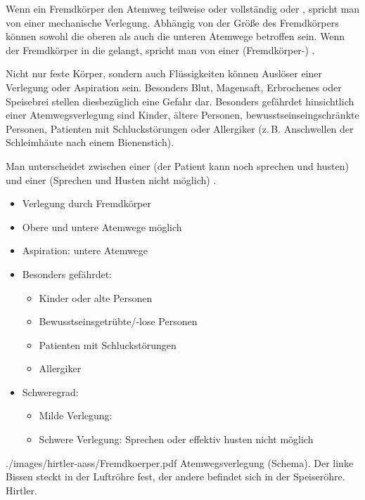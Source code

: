 {%
%
Wenn ein Fremdkörper den Atemweg teilweise oder vollständig 
 oder , spricht man von einer
mechanische Verlegung. Abhängig von der Größe des
Fremdkörpers können sowohl die oberen als auch die unteren
Atemwege betroffen sein. Wenn der Fremdkörper in die
 gelangt, spricht man von einer
(Fremdkörper-) .

Nicht nur feste Körper, sondern auch Flüssigkeiten können
Auslöser einer Verlegung oder Aspiration sein. Besonders
Blut, Magensaft, Erbrochenes oder Speisebrei stellen
diesbezüglich eine Gefahr dar.
Besonders gefährdet hinsichtlich einer Atemwegsverlegung sind
Kinder, ältere Personen, bewusstseinseingschränkte Personen,
Patienten mit Schluckstörungen oder Allergiker (z.\,B.
Anschwellen der Schleimhäute nach einem Bienenstich).

Man unterscheidet zwischen einer  (der Patient
kann noch sprechen und husten) und einer
 (Sprechen und Husten nicht
möglich) \citep{Erc2005Sec2,Erc2005Sec6,Erc2005DeSec2,Erc2005DeSec6}.



}
{%
\begin{itemize}
  \item Verlegung durch Fremdkörper
  \item Obere und untere Atemwege möglich
  \item Aspiration: untere Atemwege
  \item Besonders gefährdet:
  \begin{itemize}
    \item Kinder oder alte Personen
    \item Bewusstseinsgetrübte/-lose Personen
    \item Patienten mit Schluckstörungen
    \item Allergiker
  \end{itemize}
  \item Schweregrad:
  \begin{itemize}
    \item Milde Verlegung: 
    \item Schwere Verlegung: Sprechen oder
    effektiv husten nicht möglich
  \end{itemize}
\end{itemize}
}
{./images/hirtler-aass/Fremdkoerper.pdf}
{Atemwegsverlegung (Schema). Der linke Bissen steckt in der Luftröhre fest, der
andere befindet sich in der Speiseröhre.}
{Hirtler.}




